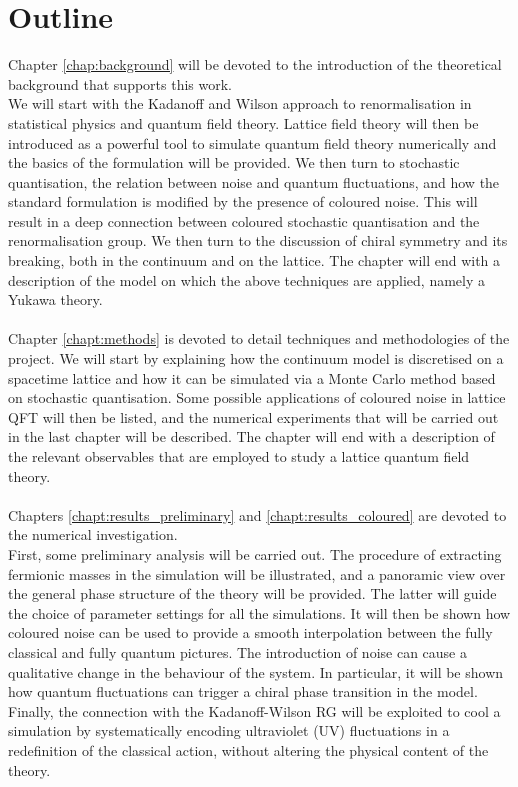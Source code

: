 \section{Outline}
Chapter \ref{chap:background} will be devoted to the introduction of the theoretical background that supports this work. \\
We will start with the Kadanoff and Wilson approach to renormalisation in statistical physics and quantum field theory.
Lattice field theory will then be introduced as a powerful tool to simulate quantum field theory numerically and the basics of the formulation will be provided.     
We then turn to stochastic quantisation, the relation between noise and quantum fluctuations, and how the standard formulation is modified by the presence of coloured noise. 
This will result in a deep connection between coloured stochastic quantisation and the renormalisation group. We then turn to the discussion of chiral symmetry and its breaking, both in the continuum and on the lattice.
The chapter will end with a description of the model on which the above techniques are applied, namely a Yukawa theory. \\~\\
Chapter \ref{chapt:methods} is devoted to detail techniques and methodologies of the project. We will start by explaining how the continuum model is discretised on a spacetime lattice and how it can be simulated via a Monte Carlo method based on stochastic quantisation.
Some possible applications of coloured noise in lattice QFT will then be listed, and the numerical experiments that will be carried out in the last chapter will be described.
The chapter will end with a description of the relevant observables that are employed to study a lattice quantum field theory. \\~\\
Chapters \ref{chapt:results_preliminary} and \ref{chapt:results_coloured} are devoted to the numerical investigation. \\
First, some preliminary analysis will be carried out. The procedure of extracting fermionic masses in the simulation will be illustrated, and a panoramic view over the general phase structure of the theory will be provided. The latter will guide the choice of parameter settings for all the simulations.
It will then be shown how coloured noise can be used to provide a smooth interpolation between the fully classical and fully quantum pictures.
The introduction of noise can cause a qualitative change in the behaviour of the system. In particular, it will be shown how quantum fluctuations can trigger a chiral phase transition in the model.
Finally, the connection with the Kadanoff-Wilson RG will be exploited to cool a simulation by systematically encoding ultraviolet (UV) fluctuations in a redefinition of the classical action, without altering the physical content of the theory.